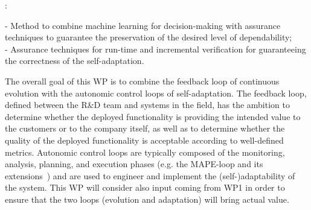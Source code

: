 \documentclass[12pt]{article}
\begin{document}
 

:
  

 - Method to combine machine learning for decision-making with assurance techniques to guarantee the preservation of the desired level of dependability; \\%
 - Assurance techniques for run-time and incremental verification for guaranteeing the correctness of the self-adaptation.

\vspace{.2cm}

\noindent The overall goal of this WP is to combine the feedback loop of continuous evolution with the autonomic control loops of self-adaptation. 
The feedback loop, defined  between the R\&D team and systems in the field, has the ambition to determine whether the
deployed functionality is providing the intended value to the
customers or to the company itself, as well as to determine whether the quality of the deployed functionality is acceptable according to well-defined metrics. 
Autonomic control loops are typically composed of the monitoring, analysis, planning, and execution phases (e.g. the MAPE-loop and its extensions~\cite{MARTAssurance}) and are used to engineer and implement the (self-)adaptability of the system. This WP will consider also input coming from WP1 in order to ensure that the two loops (evolution and adaptation) will bring actual value. 
\end{document}

